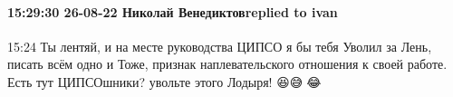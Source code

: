  
 
 
 
 

\paragraph{15:29:30 26-08-22 Николай Венедиктовreplied to ivan}
15:24
Ты лентяй, и на месте руководства ЦИПСО я бы тебя Уволил за Лень, писать всём одно и Тоже, признак наплевательского отношения к своей работе.
Есть тут ЦИПСОшники? увольте этого Лодыря! 😆😅🤣😂
